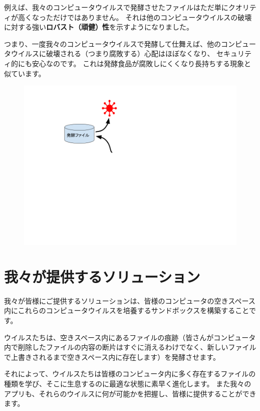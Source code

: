 \documentclass[12pt, unicode]{beamer}
\begin{document}
\begin{frame}

例えば、我々のコンピュータウイルスで発酵させたファイルはただ単にクオリティが高くなっただけではありません。
それは他のコンピュータウイルスの破壊に対する強い\textbf{ロバスト（頑健）性}を示すようになりました。

\end{frame}
\begin{frame}

\vspace{2\baselineskip}

つまり、一度我々のコンピュータウイルスで発酵して仕舞えば、他のコンピュータウイルスに破壊される（つまり腐敗する）心配はほぼなくなり、
セキュリティ的にも安心なのです。
これは発酵食品が腐敗しにくくなり長持ちする現象と似ています。

\begin{figure}[htbp]
  \begin{minipage}[b]{0.8\linewidth}
    \centering
    \includegraphics[keepaspectratio, scale=0.3]{fig2.png}
  \end{minipage}
\end{figure}


\end{frame}

\section{我々が提供するソリューション}

\begin{frame}

我々が皆様にご提供するソリューションは、皆様のコンピュータの空きスペース内にこれらのコンピュータウイルスを培養するサンドボックスを構築することです。

ウイルスたちは、空きスペース内にあるファイルの痕跡（皆さんがコンピュータ内で削除したファイルの内容の断片はすぐに消えるわけでなく、新しいファイルで上書きされるまで空きスペース内に存在します）を発酵させます。

それによって、ウイルスたちは皆様のコンピュータ内に多く存在するファイルの種類を学び、そこに生息するのに最適な状態に素早く進化します。
また我々のアプリも、それらのウイルスに何が可能かを把握し、皆様に提供することができます。

\end{frame}
\end{document}
